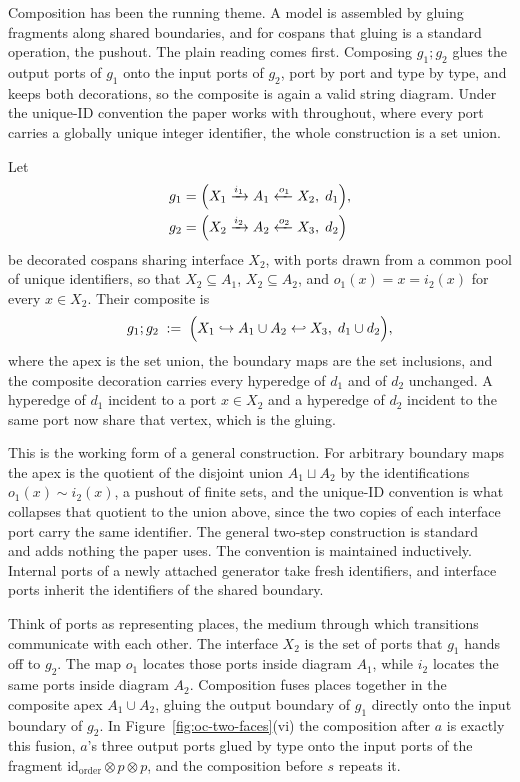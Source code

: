Composition has been the running theme. A model is assembled by gluing fragments
along shared boundaries, and for cospans that gluing is a standard operation, the
pushout. The plain reading comes first. Composing $g_1;g_2$ glues the output
ports of $g_1$ onto the input ports of $g_2$, port by port and type by type, and
keeps both decorations, so the composite is again a valid string diagram. Under
the unique-ID convention the paper works with throughout, where every port
carries a globally unique integer identifier, the whole construction is a set
union.
\begin{definition}\label{def:pushout}
Let
\begin{align}
g_1 &= \Bigl(X_1 \xrightarrow{i_1} A_1 \xleftarrow{o_1} X_2,\; d_1\Bigr),\\
g_2 &= \Bigl(X_2 \xrightarrow{i_2} A_2 \xleftarrow{o_2} X_3,\; d_2\Bigr)
\end{align}
be decorated cospans sharing interface $X_2$, with ports drawn from a common
pool of unique identifiers, so that $X_2\subseteq A_1$, $X_2\subseteq A_2$, and
$o_1(x)=x=i_2(x)$ for every $x\in X_2$. Their composite is
\begin{equation}
g_1;g_2 \;:=\;
\Bigl(X_1\hookrightarrow A_1\cup A_2\hookleftarrow X_3,\; d_1\cup d_2\Bigr),
\end{equation}
where the apex is the set union, the boundary maps are the set inclusions, and
the composite decoration carries every hyperedge of $d_1$ and of $d_2$
unchanged. A hyperedge of $d_1$ incident to a port $x\in X_2$ and a hyperedge
of $d_2$ incident to the same port now share that vertex, which is the gluing.
\end{definition}
This is the working form of a general construction. For arbitrary boundary maps
the apex is the quotient of the disjoint union $A_1\sqcup A_2$ by the
identifications $o_1(x)\sim i_2(x)$, a pushout of finite sets, and the unique-ID
convention is what collapses that quotient to the union above, since the two
copies of each interface port carry the same identifier. The general two-step
construction is standard~\cite{fongDecoratedCospans2015} and adds nothing the
paper uses. The convention is maintained inductively. Internal ports of a newly
attached generator take fresh identifiers, and interface ports inherit the
identifiers of the shared boundary.

\begin{remark}
Think of ports as representing places, the medium through which transitions communicate with each other.
The interface $X_2$ is the set of ports that $g_1$ hands off to $g_2$.
The map $o_1$ locates those ports inside diagram $A_1$, while $i_2$
locates the same ports inside diagram $A_2$.
Composition fuses places together in the composite apex $A_1\cup A_2$, gluing the output
boundary of $g_1$ directly onto the input boundary of $g_2$.
In Figure~\ref{fig:oc-two-faces}(vi) the composition after $a$ is exactly this fusion,
$a$'s three output ports glued by type onto the input ports of the fragment
$\mathrm{id}_{\mathrm{order}}\otimes p\otimes p$, and the composition before $s$ repeats it.
\end{remark}

